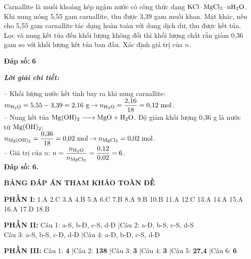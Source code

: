 \documentclass[11pt,a4paper]{article}
\def\loigiai#1{
\par\begingroup\color{blue!80!black}\small
\noindent\textbf{\textit{Lời giải chi tiết:}}\par
#1\par\endgroup}
\begin{document}
\begin{ex}
Carnallite là muối khoáng kép ngậm nước có công thức dạng $\ce{KCl.MgCl2.nH2O}$. Khi nung nóng 5,55 gam carnallite, thu được 3,39 gam muối khan. Mặt khác, nếu cho 5,55 gam carnallite tác dụng hoàn toàn với dung dịch  dư, thu được kết tủa. Lọc và nung kết tủa đến khối lượng không đổi thì khối lượng chất rắn giảm 0,36 gam so với khối lượng kết tủa ban đầu. Xác định giá trị của $n$.
\par\noindent\textbf{Đáp số:} \textbf{\color{red}6}
\loigiai{
-- Khối lượng nước kết tinh bay ra khi nung carnallite:\\
$m_{\ce{H2O}} = 5{,}55 - 3{,}39 = 2{,}16\text{ g} \rightarrow n_{\ce{H2O}} = \dfrac{2{,}16}{18} = 0{,}12\text{ mol}$.\\
-- Nung kết tủa $\ce{Mg(OH)2 -> MgO + H2O}$. Độ giảm khối lượng 0,36 g là nước từ $\ce{Mg(OH)2}$:\\
$n_{\ce{Mg(OH)2}} = \dfrac{0{,}36}{18} = 0{,}02\text{ mol} \rightarrow n_{\ce{MgCl2}} = 0{,}02\text{ mol}$.\\
-- Giá trị của $n$: $n = \dfrac{n_{\ce{H2O}}}{n_{\ce{MgCl2}}} = \dfrac{0{,}12}{0{,}02} = 6$.\\
\textbf{Đáp số: 6.}}
\end{ex}

\vspace{0.3cm}
\noindent
\textbf{\color{hfRed}\large BẢNG ĐÁP ÁN THAM KHẢO TOÀN ĐỀ}

\vspace{0.1cm}
\noindent
\textbf{\color{mainGreen}PHẦN I:} 1.A \quad 2.C \quad 3.A \quad 4.B \quad 5.A \quad 6.C \quad 7.B \quad 8.A \quad 9.B \quad 10.B \quad 11.A \quad 12.C \quad 13.A \quad 14.A \quad 15.A \quad 16.A \quad 17.D \quad 18.B

\vspace{0.1cm}
\noindent
\textbf{\color{mainGreen}PHẦN II:} Câu 1: a-S, b-Đ, c-S, d-Đ \quad|\quad Câu 2: a-Đ, b-S, c-S, d-S\\
Câu 3: a-S, b-S, c-Đ, d-Đ \quad|\quad Câu 4: a-Đ, b-Đ, c-S, d-Đ

\vspace{0.1cm}
\noindent
\textbf{\color{mainGreen}PHẦN III:} Câu 1: \textbf{4} \quad|\quad Câu 2: \textbf{138} \quad|\quad Câu 3: \textbf{3} \quad|\quad Câu 4: \textbf{3} \quad|\quad Câu 5: \textbf{27,4} \quad|\quad Câu 6: \textbf{6}

\end{document}
